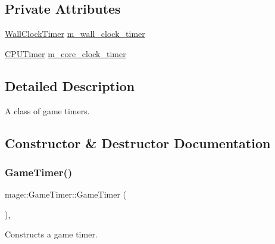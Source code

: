 \subsection*{Private Attributes}
\begin{DoxyCompactItemize}
\item 
\mbox{\hyperlink{namespacemage_a06f4035ef59f07892e594bf1178a108a}{Wall\+Clock\+Timer}} \mbox{\hyperlink{classmage_1_1_game_timer_ae3746f7a55d6b150f2d1fead4a1f227c}{m\+\_\+wall\+\_\+clock\+\_\+timer}}
\item 
\mbox{\hyperlink{namespacemage_a1032d81f22079b7190cac3bf14136068}{C\+P\+U\+Timer}} \mbox{\hyperlink{classmage_1_1_game_timer_a7eb2652e13e4688115474a136a70c714}{m\+\_\+core\+\_\+clock\+\_\+timer}}
\end{DoxyCompactItemize}


\subsection{Detailed Description}
A class of game timers. 

\subsection{Constructor \& Destructor Documentation}
\mbox{\label{classmage_1_1_game_timer_a171e5e335b8c2ba77ce80b64bcad9ef5}} 
\subsubsection{\texorpdfstring{Game\+Timer()}{GameTimer()}\hspace{0.1cm}{\footnotesize\ttfamily [1/3]}}
{\footnotesize\ttfamily mage\+::\+Game\+Timer\+::\+Game\+Timer (\begin{DoxyParamCaption}{ }\end{DoxyParamCaption})\hspace{0.3cm}{\ttfamily [default]}, {\ttfamily [noexcept]}}

Constructs a game timer. \mbox{\label{classmage_1_1_game_timer_a0c70f8245381120b6e334db078affa00}} 
